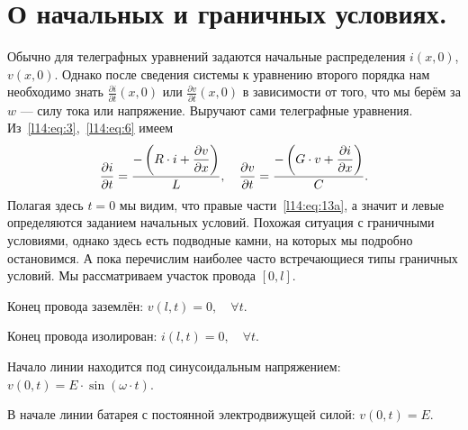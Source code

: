 \documentclass[12pt,a4paper,openany,fleqn]{book}
\newcommand{\pder}[2]{\ensuremath{\frac{\partial#1}{\partial#2}}}
\theoremstyle{definition}
\begin{document}
	\section{О начальных и граничных условиях.}
	\label{lecture14section2}
	Обычно для телеграфных уравнений задаются начальные распределения $i(x,0)$, $v(x,0)$. Однако после сведения системы к уравнению второго порядка нам необходимо знать $\displaystyle\pder{i}{t}(x,0)$ или $\displaystyle\pder{v}{t}(x,0)$ в зависимости от того, что мы берём за $w$ --- силу тока или напряжение. Выручают сами телеграфные уравнения. Из~\eqref{l14:eq:3},~\eqref{l14:eq:6} имеем 
	\begin{equation}\label{l14:eq:13a}
		\hfill\pder{i}{t}=\displaystyle\frac{\displaystyle-\left(R\cdot i+\pder{v}{x}\right)}{L},\quad \pder{v}{t}=\displaystyle\frac{\displaystyle-\left(G\cdot v+\pder{i}{x}\right)}{C}.  \hfill
	\end{equation}
	Полагая здесь $t=0$ мы видим, что правые части~\eqref{l14:eq:13a}, а значит и левые определяются заданием начальных условий. Похожая ситуация с граничными условиями, однако здесь есть подводные камни, на которых мы подробно остановимся. А пока перечислим наиболее часто встречающиеся типы граничных условий. Мы рассматриваем участок провода $[0,l]$.
	\begin{enumerateD}
		\item Конец провода заземлён: $v(l,t)=0,\quad\forall t$.
		\item Конец провода изолирован: $i(l,t)=0,\quad\forall t$.
		\item Начало линии находится под синусоидальным напряжением: $v(0,t)=E\cdot\sin\left(\omega\cdot t\right)$.
		\item В начале линии батарея с постоянной электродвижущей силой: $v(0,t)=E$.
	\end{enumerateD}
	
\end{document}
